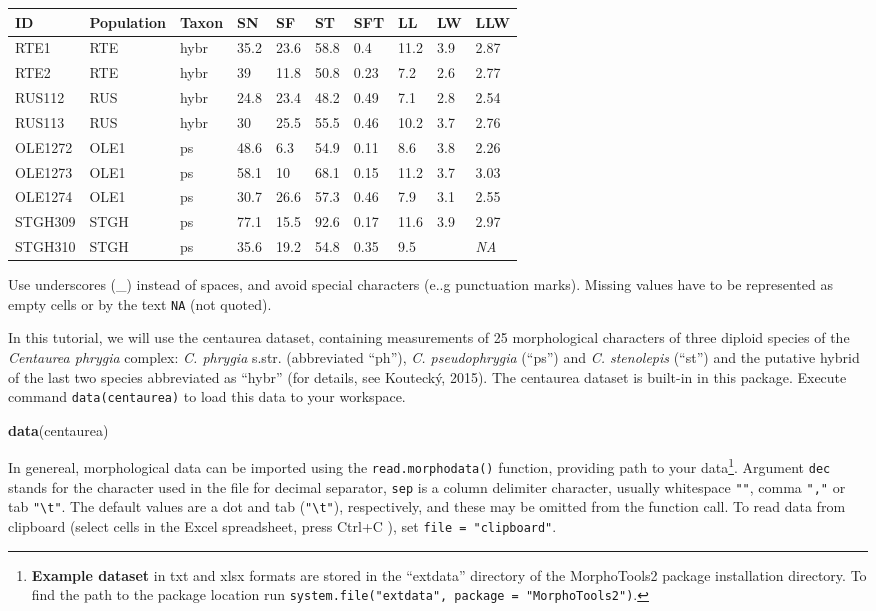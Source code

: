 \documentclass[
]{article}
\newenvironment{Shaded}{\begin{snugshade}}{\end{snugshade}}
\newcommand{\KeywordTok}[1]{\textcolor[rgb]{0.13,0.29,0.53}{\textbf{#1}}}
\newcommand{\NormalTok}[1]{#1}
\begin{document}
\begin{longtable}[]{@{}llllllllll@{}}
\toprule
ID & Population & Taxon & SN & SF & ST & SFT & LL & LW &
LLW\tabularnewline
\midrule
\endhead
RTE1 & RTE & hybr & 35.2 & 23.6 & 58.8 & 0.4 & 11.2 & 3.9 &
2.87\tabularnewline
RTE2 & RTE & hybr & 39 & 11.8 & 50.8 & 0.23 & 7.2 & 2.6 &
2.77\tabularnewline
RUS112 & RUS & hybr & 24.8 & 23.4 & 48.2 & 0.49 & 7.1 & 2.8 &
2.54\tabularnewline
RUS113 & RUS & hybr & 30 & 25.5 & 55.5 & 0.46 & 10.2 & 3.7 &
2.76\tabularnewline
OLE1272 & OLE1 & ps & 48.6 & 6.3 & 54.9 & 0.11 & 8.6 & 3.8 &
2.26\tabularnewline
OLE1273 & OLE1 & ps & 58.1 & 10 & 68.1 & 0.15 & 11.2 & 3.7 &
3.03\tabularnewline
OLE1274 & OLE1 & ps & 30.7 & 26.6 & 57.3 & 0.46 & 7.9 & 3.1 &
2.55\tabularnewline
STGH309 & STGH & ps & 77.1 & 15.5 & 92.6 & 0.17 & 11.6 & 3.9 &
2.97\tabularnewline
STGH310 & STGH & ps & 35.6 & 19.2 & 54.8 & 0.35 & 9.5 & &
\emph{NA}\tabularnewline
\bottomrule
\end{longtable}

Use underscores (\_) instead of spaces, and avoid special characters
(e..g punctuation marks). Missing values have to be represented as empty
cells or by the text \texttt{NA} (not quoted).

In this tutorial, we will use the centaurea dataset, containing
measurements of 25 morphological characters of three diploid species of
the \emph{Centaurea phrygia} complex: \emph{C. phrygia} s.str.
(abbreviated ``ph''), \emph{C. pseudophrygia} (``ps'') and \emph{C.
stenolepis} (``st'') and the putative hybrid of the last two species
abbreviated as ``hybr'' (for details, see Koutecký, 2015). The centaurea
dataset is built-in in this package. Execute command
\texttt{data(centaurea)} to load this data to your workspace.

\begin{Shaded}
\begin{Highlighting}[]
\KeywordTok{data}\NormalTok{(centaurea)}
\end{Highlighting}
\end{Shaded}

In genereal, morphological data can be imported using the
\texttt{read.morphodata()} function, providing path to your
data\footnote{\textbf{Example dataset} in txt and xlsx formats are
  stored in the ``extdata'' directory of the MorphoTools2 package
  installation directory. To find the path to the package location run
  \texttt{system.file("extdata",\ package\ =\ "MorphoTools2")}.}.
Argument \texttt{dec} stands for the character used in the file for
decimal separator, \texttt{sep} is a column delimiter character, usually
whitespace \texttt{""}, comma \texttt{","} or tab
\texttt{"\textbackslash{}t"}. The default values are a dot and tab
(\texttt{"\textbackslash{}t"}), respectively, and these may be omitted
from the function call. To read data from clipboard (select cells in the
Excel spreadsheet, press Ctrl+C ), set \texttt{file\ =\ "clipboard"}.
\end{document}
